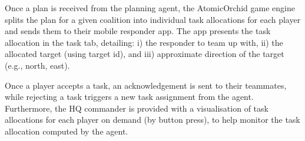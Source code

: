 Once a plan is received from the planning agent, the AtomicOrchid game engine splits the plan for a given coalition into individual task allocations for each player and sends them to their mobile responder app. The app presents the task allocation in the task tab, detailing: i) the responder to team up with, ii) the allocated target (using target id), and iii) approximate direction of the target (e.g., north, east). 

Once a player accepts a task, an acknowledgement is sent to their teammates, while rejecting a task triggers a new task assignment from the agent. Furthermore, the HQ commander is provided with a visualisation of task allocations for each player on demand (by button press), to help monitor the task allocation computed by the agent.

